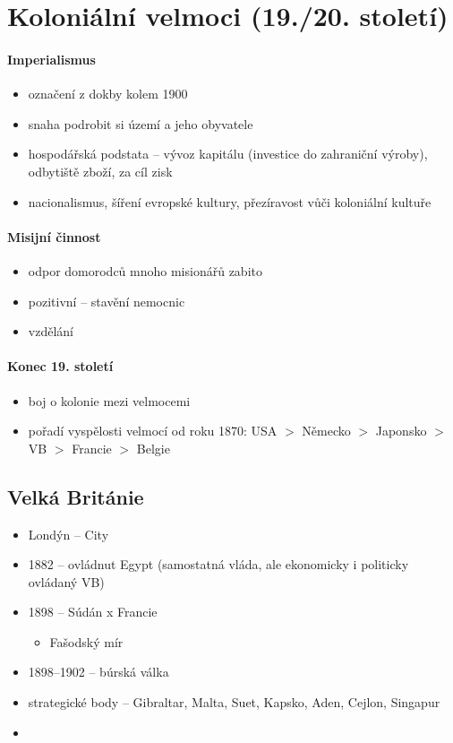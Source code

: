 \section{Koloniální velmoci (19./20. století)}
\paragraph{Imperialismus}
\begin{itemize}
\item označení z dokby kolem 1900
\item snaha podrobit si území a jeho obyvatele
\item hospodářská podstata -- vývoz kapitálu (investice do zahraniční výroby), odbytiště zboží, za cíl zisk
\item nacionalismus, šíření evropské kultury, přezíravost vůči koloniální kultuře
\end{itemize}

\paragraph{Misijní činnost}
\begin{itemize}
\item odpor domorodců \ra mnoho misionářů zabito
\item pozitivní -- stavění nemocnic 
\item vzdělání 
\end{itemize}

\paragraph{Konec 19. století}
\begin{itemize}
\item boj o kolonie mezi velmocemi
\item pořadí vyspělosti velmocí od roku 1870: USA $>$ Německo $>$ Japonsko $>$ VB $>$ Francie $>$ Belgie
\end{itemize}

\subsection{Velká Británie}
\begin{itemize}
\item Londýn -- City
\item 1882 -- ovládnut Egypt (samostatná vláda, ale ekonomicky i politicky ovládaný VB)
\item 1898 -- Súdán x Francie
	\begin{itemize}
	\item Fašodský mír
	\end{itemize}
\item 1898--1902 -- búrská válka
\item strategické body -- Gibraltar, Malta, Suet, Kapsko, Aden, Cejlon, Singapur
\item 
\end{itemize}


